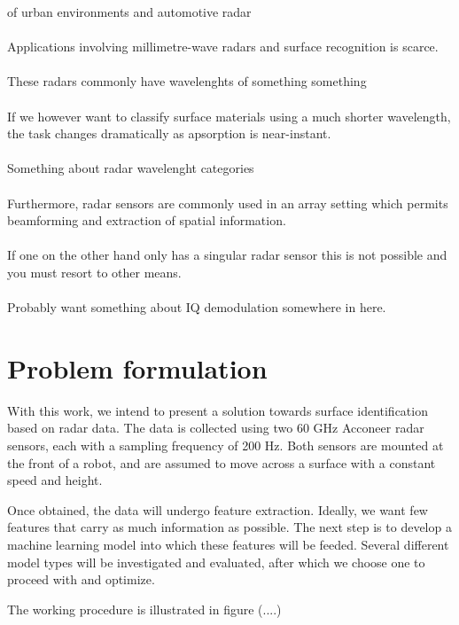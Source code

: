  of urban environments and automotive radar 
\\ \\
Applications involving millimetre-wave radars and surface recognition is scarce.  
\\ \\
These radars commonly have wavelenghts of something something
\\ \\
If we however want to classify surface materials using a much shorter wavelength, the task changes dramatically as apsorption is near-instant. 
\\ \\
Something about radar wavelenght categories
\\ \\
Furthermore, radar sensors are commonly used in an array setting which permits beamforming and extraction of spatial information. 
\\ \\
If one on the other hand only has a singular radar sensor this is not possible and you must resort to other means.
\\ \\
Probably want something about IQ demodulation somewhere in here.

\section{Problem formulation}
With this work, we intend to present a solution towards surface identification based on radar data. The data is collected using two 60 GHz Acconeer radar sensors, each with a sampling frequency of 200 Hz. Both sensors are mounted at the front of a robot, and are assumed to move across a surface with a constant speed and height.

Once obtained, the data will undergo feature extraction. Ideally, we want few features that carry as much information as possible. The next step is to develop a machine learning model into which these features will be feeded. Several different model types will be investigated and evaluated, after which we choose one to proceed with and optimize. 

The working procedure is illustrated in figure (....)



